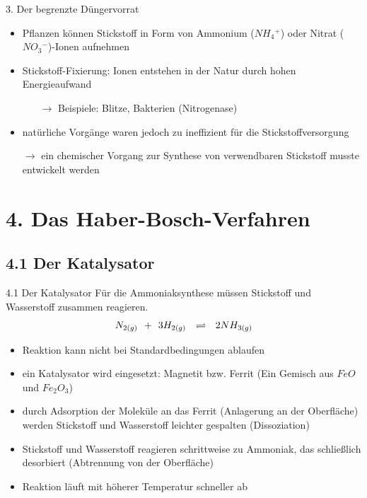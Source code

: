 \documentclass[
    aspectratio=1610
    ]{beamer}
\begin{document}
    \begin{frame}{3. Der begrenzte Düngervorrat}
            \begin{itemize}
                \item Pflanzen können Stickstoff in Form von Ammonium ($NH{_4}{^+}$) oder Nitrat ($NO{_3}{^-}$)-Ionen aufnehmen
                \item Stickstoff-Fixierung: Ionen entstehen in der Natur durch hohen Energieaufwand
                \begin{itemize}
                    \item[$\rightarrow$] Beispiele: Blitze, Bakterien (Nitrogenase)
                \end{itemize}
                \item natürliche Vorgänge waren jedoch zu ineffizient für die Stickstoffversorgung
                \item[\alert{$\rightarrow$}] \alert{ein chemischer Vorgang zur Synthese von verwendbaren Stickstoff musste entwickelt werden}
            \end{itemize}
    \end{frame}

    \section{\textbf{4.} Das Haber-Bosch-Verfahren}

    \subsection{\textbf{4.1} Der Katalysator}

    \begin{frame}{4.1 Der Katalysator}
        Für die Ammoniaksynthese müssen Stickstoff und Wasserstoff zusammen reagieren. 
        $$N_{2(g)}\hspace{.15cm} +\hspace{.15cm} 3H_{2(g)}\hspace{.25cm} \rightleftharpoons\hspace{.25cm} 2NH_{3(g)}$$
        \vspace{-.75cm}
        \begin{itemize}
            \item Reaktion kann nicht bei Standardbedingungen ablaufen
            \item ein Katalysator wird eingesetzt: Magnetit bzw. Ferrit (Ein Gemisch aus $FeO$ und $Fe_2O_3$)
            \item durch Adsorption der Moleküle an das Ferrit (Anlagerung an der Oberfläche) werden Stickstoff und Wasserstoff leichter gespalten (Dissoziation)
            \item Stickstoff und Wasserstoff reagieren schrittweise zu Ammoniak, das schließlich desorbiert (Abtrennung von der Oberfläche)
            \item Reaktion läuft mit höherer Temperatur schneller ab
        \end{itemize}
    \end{frame}
    
\end{document}
